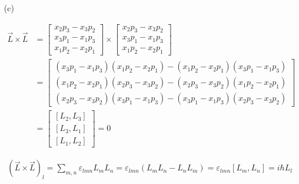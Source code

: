 \documentclass[11pt,a4paper]{article}
\begin{document}
\begin{enumerate}
\item[(c)]

\begin{align}
    \vec{L}\times\vec{L}&=
    \begin{bmatrix}
    x_2p_3-x_3p_2 \\
    x_3p_1-x_1p_3 \\
    x_1p_2-x_2p_1
    \end{bmatrix}
    \times
    \begin{bmatrix}
x_2p_3-x_3p_2 \\
x_3p_1-x_1p_3 \\
x_1p_2-x_2p_1
    \end{bmatrix}\\&=
    \begin{bmatrix}
    (x_3p_1-x_1p_3)(x_1p_2-x_2p_1)-(x_1p_2-x_2p_1)(x_3p_1-x_1p_3)\\
    (x_1p_2-x_2p_1)(x_2p_3-x_3p_2)-(x_2p_3-x_3p_2)(x_1p_2-x_2p_1)\\
    (x_2p_3-x_3p_2)(x_3p_1-x_1p_3)-(x_3p_1-x_1p_3)(x_2p_3-x_3p_2)
    \end{bmatrix}\\&=
    \begin{bmatrix}
    [L_2,L_3] \\
    [L_3,L_1] \\
    [L_1,L_2]
    \end{bmatrix}=0
\end{align}

\begin{align}
    (\vec{L}\times\vec{L})_l=\sum_{m,n}\varepsilon_{lmn}L_mL_n=\varepsilon_{lmn}(L_mL_n-L_nL_m)=\varepsilon_{lmn}[L_m,L_n]=i\hbar L_l
\end{align}

\end{enumerate}
\end{document}
